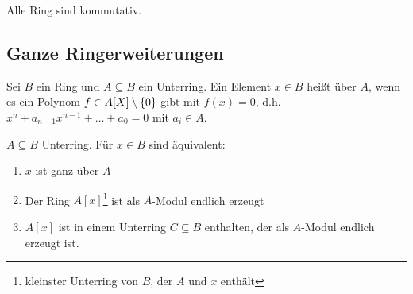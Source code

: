 \documentclass[../main.tex]{subfiles}
\begin{document}
Alle Ring sind kommutativ.
\subsection{Ganze Ringerweiterungen}
\begin{definition}
    Sei $B$ ein Ring und $A\subseteq B$ ein Unterring. Ein Element $x\in B$ heißt  über $A$, wenn es ein  Polynom $f\in A[X]\setminus \{0\}$ gibt mit $f(x)=0$, d.h. $x^n + a_{n-1}x^{n-1} + \dots + a_0 = 0$ mit $a_i\in A$.
\end{definition}
\begin{theorem}\label{theo:6.2}
    $A\subseteq B$ Unterring. Für $x\in B$ sind äquivalent:
    \begin{enumerate}[label=(\roman*)]
        \item $x$ ist ganz über $A$
        \item Der Ring $A[x]$\footnote{kleinster Unterring von $B$, der $A$ und $x$ enthält} ist als $A$-Modul endlich erzeugt
        \item $A[x]$ ist in einem Unterring $C\subseteq B$ enthalten, der als $A$-Modul endlich erzeugt ist.
    \end{enumerate}
\end{theorem}
\end{document}
